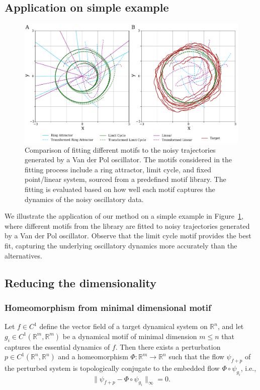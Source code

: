 \documentclass{article}
\theoremstyle{definition} \newtheorem{definition}{Definition}  \newtheorem{example}{Example}
\theoremstyle{remark} \newtheorem{remark}{Remark}
\newcounter{ct}
\begin{document}
\subsection{Application on simple example}
\begin{figure}[htbp]
    \centering
    \includegraphics[width=.9\linewidth]{all_motifs_vdp_noisy_var1_ntraj5_ai}
    \caption{Comparison of fitting different motifs to the noisy trajectories generated by a Van der Pol oscillator. The motifs considered in the fitting process include a ring attractor, limit cycle, and fixed point/linear system, sourced from a predefined motif library. The fitting is evaluated based on how well each motif captures the dynamics of the noisy oscillatory data.}
    \label{fig:all_motifs_vdp}
\end{figure}

We illustrate the application of our method on a simple example in Figure~\ref{fig:all_motifs_vdp}, where different motifs from the library are fitted to noisy trajectories generated by a Van der Pol oscillator.
Observe that the limit cycle motif provides the best fit, capturing the underlying oscillatory dynamics more accurately than the alternatives.




\subsection{Reducing the dimensionality} %
\subsubsection{Homeomorphism from minimal dimensional motif}
Let \( f \in C^1 \) define the vector field of a target dynamical system on \( \mathbb{R}^n \), and let \( g_i \in C^1(\mathbb{R}^m, \mathbb{R}^m) \) be a dynamical motif of minimal dimension \( m \leq n \) that captures the essential dynamics of \( f \). Then there exists a perturbation \( p \in C^1(\mathbb{R}^n, \mathbb{R}^n) \) and a homeomorphism \( \Phi: \mathbb{R}^m \to \mathbb{R}^n \) such that the flow \( \psi_{f+p} \) of the perturbed system is topologically conjugate to the embedded flow \( \Phi \circ \psi_{g_i} \), i.e.,
\begin{equation}\label{eq:hom_from_motif}
\|\psi_{f+p} - \Phi \circ \psi_{g_i} \|_\infty = 0.
\end{equation}
\end{document}
